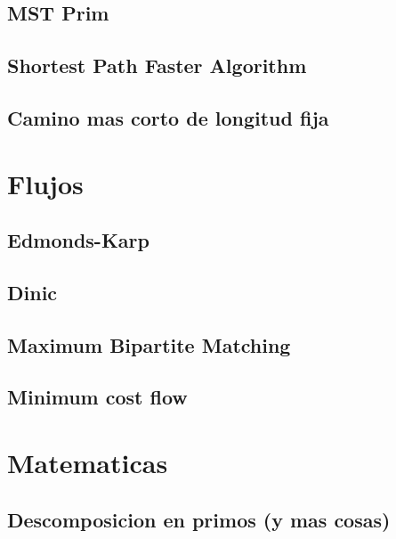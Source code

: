 \subsection{MST Prim}
\raggedbottom
\hrulefill
\subsection{Shortest Path Faster Algorithm}
\raggedbottom
\hrulefill
\subsection{Camino mas corto de longitud fija}
\raggedbottom
\hrulefill

\section{Flujos}
\subsection{Edmonds-Karp}
\raggedbottom
\hrulefill
\subsection{Dinic}
\raggedbottom
\hrulefill
\subsection{Maximum Bipartite Matching}
\raggedbottom
\hrulefill
\subsection{Minimum cost flow}
\raggedbottom
\hrulefill

\section{Matematicas}
\subsection{Descomposicion en primos (y mas cosas)}
\raggedbottom
\hrulefill
